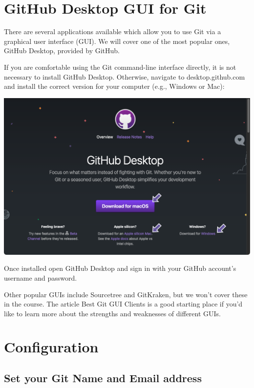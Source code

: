 \documentclass[
  letterpaper,
  DIV=11,
  numbers=noendperiod]{scrartcl}
\begin{document}
\section{GitHub Desktop GUI for Git}\label{github-desktop-gui-for-git}

There are several applications available which allow you to use Git via
a graphical user interface (GUI). We will cover one of the most popular
ones, GitHub Desktop, provided by GitHub.

If you are comfortable using the Git command-line interface directly, it
is not necessary to install GitHub Desktop. Otherwise, navigate to
desktop.github.com and install the correct version for your computer
(e.g., Windows or Mac):

\includegraphics{images/image3.png}

Once installed open GitHub Desktop and sign in with your GitHub
account's username and password.

Other popular GUIs include Sourcetree and GitKraken, but we won't cover
these in the course. The article Best Git GUI Clients is a good starting
place if you'd like to learn more about the strengths and weaknesses of
different GUIs.

\section{Configuration}\label{configuration}

\subsection{Set your Git Name and Email
address}\label{set-your-git-name-and-email-address}
\end{document}
